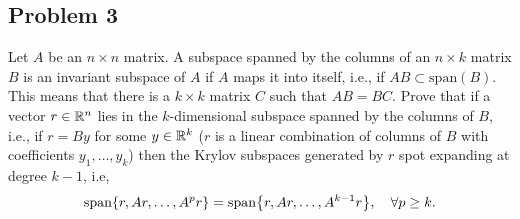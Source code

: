 \documentclass[12pt]{report}
\begin{document}


\begin{problem}%
\subsection*{Problem 3}

Let $A$ be an $n\times  n$ matrix. A subspace spanned by the columns of an $n \times k$ matrix $B$ is an invariant subspace of $A$ if $A$ maps it into itself, i.e., if $AB \subset \text{span}(B)$. This means that there is a $k \times k$ matrix $C$ such that $AB = BC$. Prove that if a vector $r \in {\mathbb R}^n$ lies in the $k$-dimensional subspace spanned by the columns of $B$, i.e., if $r = By$ for some $y \in {\mathbb R}^k$ ($r$ is a linear combination of columns of $B$ with coefficients $y_1, \dots , y_k$) then the Krylov subspaces generated by $r$ spot expanding at degree $k - 1$, i.e,
\[
     \text{span}{\left\{r,Ar,\dots,A^pr\right\}} = \text{span}{\left\{r,Ar,\dots,A^{k-1}r\right\}}, \quad \forall p \geq k.
\]


\end{problem}
\end{document}
